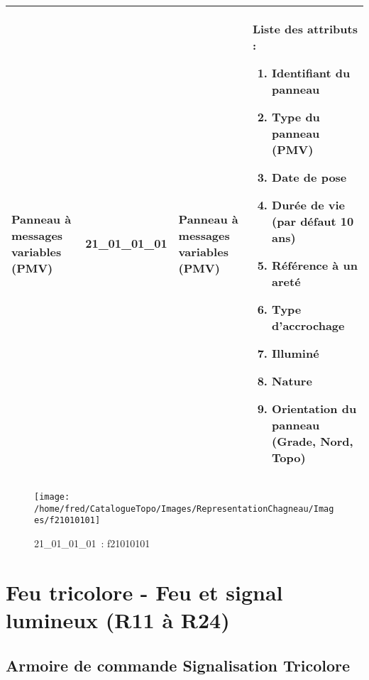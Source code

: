 \documentclass[12pt,titlepage]{book}
\begin{document}
\renewcommand{\arraystretch}{1.2}
\begin{supertabular}{|p{10cm}|c|p{13cm}|p{12cm}|}
 Panneau à messages variables (PMV) & 21\_01\_01\_01 & Panneau à messages variables (PMV) & Liste des attributs :
\begin{enumerate}
  \item Identifiant du panneau  \item Type du panneau (PMV)  \item Date de pose  \item Durée de vie (par défaut 10 ans)  \item Référence à un areté  \item Type d'accrochage  \item Illuminé  \item Nature  \item Orientation du panneau (Grade, Nord, Topo)\end{enumerate}
\\
\hline
\end{supertabular}
\begin{figure}[h!]
  \hfill         %
  \begin{minipage}[t]{3cm}
    \begin{center}
      \texttt{[image: /home/fred/CatalogueTopo/Images/RepresentationChagneau/Images/f21010101]}
      \caption[~21\_01\_01\_01]{\small{21\_01\_01\_01~:} \tiny{f21010101}}\label{f21010101}
    \end{center}
  \end{minipage}
\end{figure}

\section{\large Feu tricolore - Feu et signal lumineux (R11 à R24)}
\subsection{Armoire de commande Signalisation Tricolore}
\noindent
\vspace{\baselineskip}
\end{document}
